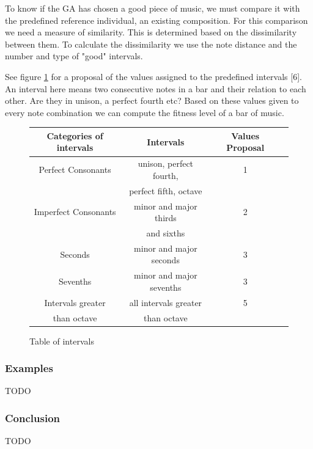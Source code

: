 \documentclass[12pt]{article}
\begin{document}
To know if the GA has chosen a good piece of music, we must compare it with the predefined reference individual, an existing composition. For this comparison we need a measure of similarity. This is determined based on the dissimilarity between them. To calculate the dissimilarity we use the note distance and the number and type of "good" intervals.
\newline
\newline

See figure \ref{tableintervals} for a proposal of the values assigned to the predefined intervals [6]. An interval here means two consecutive notes in a bar and their relation to each other. Are they in unison, a perfect fourth etc? Based on these values given to every note combination we can compute the fitness level of a bar of music.

\begin{figure}
\begin{tabular}{| c | c | c | c |}
\hline
\textbf{Categories of intervals} & \textbf{Intervals} & \textbf{Values Proposal} \\
\hline
Perfect Consonants & unison, perfect fourth, & 1  \\ 
& perfect fifth, octave & \\
\hline
Imperfect Consonants & minor and major thirds & 2 \\
& and sixths & \\
\hline
Seconds & minor and major seconds & 3 \\
 \hline
Sevenths & minor and major sevenths & 3 \\
\hline
Intervals greater & all intervals greater & 5 \\
than octave & than octave & \\

\hline
\end{tabular}
\caption{Table of intervals}
\label{tableintervals}
\end{figure}

\subsubsection{Examples}

TODO

\subsubsection{Conclusion}

TODO
\end{document}
